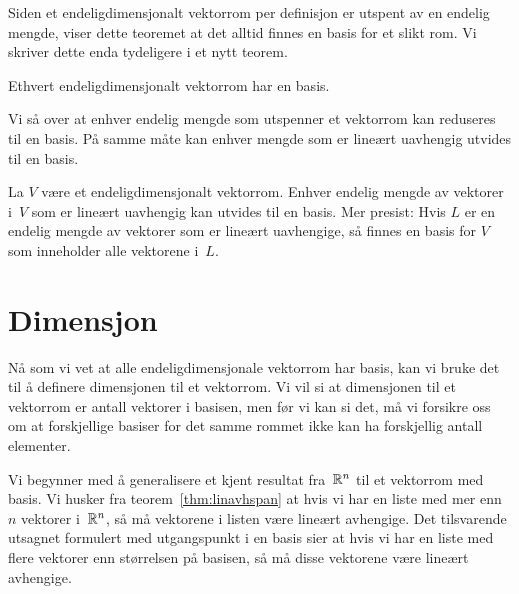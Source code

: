 Siden et endeligdimensjonalt vektorrom per definisjon er utspent av en
endelig mengde, viser dette teoremet at det alltid finnes en basis for
et slikt rom.  Vi skriver dette enda tydeligere i et nytt teorem.

\begin{thm}
Ethvert endeligdimensjonalt vektorrom har en basis.
\end{thm}

Vi så over at enhver endelig mengde som utspenner et vektorrom kan
reduseres til en basis.  På samme måte kan enhver mengde som er
lineært uavhengig utvides til en basis.

\begin{thm}
La $V$ være et endeligdimensjonalt vektorrom.  Enhver endelig mengde
av vektorer i~$V$ som er lineært uavhengig kan utvides til en basis.
Mer presist: Hvis $L$ er en endelig mengde av vektorer som er lineært
uavhengige, så finnes en basis for $V$ som inneholder alle vektorene
i~$L$.
\end{thm}


\section*{Dimensjon}

Nå som vi vet at alle endeligdimensjonale vektorrom har basis, kan vi
bruke det til å definere dimensjonen til et vektorrom.  Vi vil si at
dimensjonen til et vektorrom er antall vektorer i basisen, men før vi
kan si det, må vi forsikre oss om at forskjellige basiser for det
samme rommet ikke kan ha forskjellig antall elementer.

Vi begynner med å generalisere et kjent resultat fra~$\mathbb{R}^n$ til et
vektorrom med basis.  Vi husker fra teorem~\ref{thm:linavhspan} at
hvis vi har en liste med mer enn~$n$ vektorer i~$\mathbb{R}^n$, så må
vektorene i listen være lineært avhengige.  Det tilsvarende utsagnet
formulert med utgangspunkt i en basis sier at hvis vi har en liste med
flere vektorer enn størrelsen på basisen, så må disse vektorene være
lineært avhengige.

